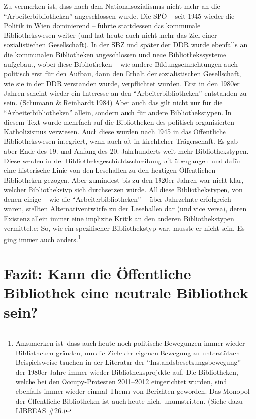 \documentclass[a4paper,
fontsize=11pt,
oneside,
numbers=noperiodatend,
parskip=half-,
bibliography=totoc,
final
]{scrartcl}
\begin{document}
Zu vermerken ist, dass nach dem Nationalsozialismus nicht mehr an die
\enquote{Arbeiterbibliotheken} angeschlossen wurde. Die SPÖ -- seit 1945
wieder die Politik in Wien dominierend -- führte stattdessen das
kommunale Bibliothekswesen weiter (und hat heute auch nicht mehr das
Ziel einer sozialistischen Gesellschaft). In der SBZ und später der DDR
wurde ebenfalls an die kommunalen Bibliotheken angeschlossen und neue
Bibliothekssysteme aufgebaut, wobei diese Bibliotheken -- wie andere
Bildungseinrichtungen auch -- politisch erst für den Aufbau, dann den
Erhalt der sozialistischen Gesellschaft, wie sie in der DDR verstanden
wurde, verpflichtet wurden. Erst in den 1980er Jahren scheint wieder ein
Interesse an den \enquote{Arbeiterbibliotheken} entstanden zu sein.
(Schumann \& Reinhardt 1984) Aber auch das gilt nicht nur für die
\enquote{Arbeiterbibliotheken} allein, sondern auch für andere
Bibliothekstypen. In diesem Text wurde mehrfach auf die Bibliotheken des
politisch organisierten Katholizismus verwiesen. Auch diese wurden nach
1945 in das Öffentliche Bibliothekswesen integriert, wenn auch oft in
kirchlicher Trägerschaft. Es gab aber Ende des 19. und Anfang des 20.
Jahrhunderts weit mehr Bibliothekstypen. Diese werden in der
Bibliotheksgeschichtsschreibung oft übergangen und dafür eine
historische Linie von den Lesehallen zu den heutigen Öffentlichen
Bibliotheken gezogen. Aber zumindest bis zu den 1920er Jahren war nicht
klar, welcher Bibliothekstyp sich durchsetzen würde. All diese
Bibliothekstypen, von denen einige -- wie die
\enquote{Arbeiterbibliotheken} -- über Jahrzehnte erfolgreich waren,
stellten Alternativentwürfe zu den Lesehallen dar (und vice versa),
deren Existenz allein immer eine implizite Kritik an den anderen
Bibliothekstypen vermittelte: So, wie ein spezifischer Bibliothekstyp
war, musste er nicht sein. Es ging immer auch anders.\footnote{Anzumerken
  ist, dass auch heute noch politische Bewegungen immer wieder
  Bibliotheken gründen, um die Ziele der eigenen Bewegung zu
  unterstützen. Beispielsweise tauchen in der Literatur der
  \enquote{Instandsbesetzungsbewegung} der 1980er Jahre immer wieder
  Bibliotheksprojekte auf. Die Bibliotheken, welche bei den
  Occupy-Protesten 2011--2012 eingerichtet wurden, sind ebenfalls immer
  wieder einmal Thema von Berichten geworden. Das Monopol der
  Öffentliche Bibliotheken ist auch heute nicht unumstritten. (Siehe
  dazu LIBREAS \#26.)}

\hypertarget{fazit-kann-die-uxf6ffentliche-bibliothek-eine-neutrale-bibliothek-sein}{%
\section{Fazit: Kann die Öffentliche Bibliothek eine neutrale
Bibliothek
sein?}\label{fazit-kann-die-uxf6ffentliche-bibliothek-eine-neutrale-bibliothek-sein}}
\end{document}

